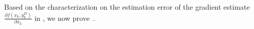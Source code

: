 \documentclass{osudissert96}
\newtheorem{lemma}{Lemma}
\begin{document}
Based on the characterization on the estimation error of the gradient estimate $\frac{\partial f(x_k,y^D_k)}{\partial x_k}$ in , we now prove~. 
\end{document}
